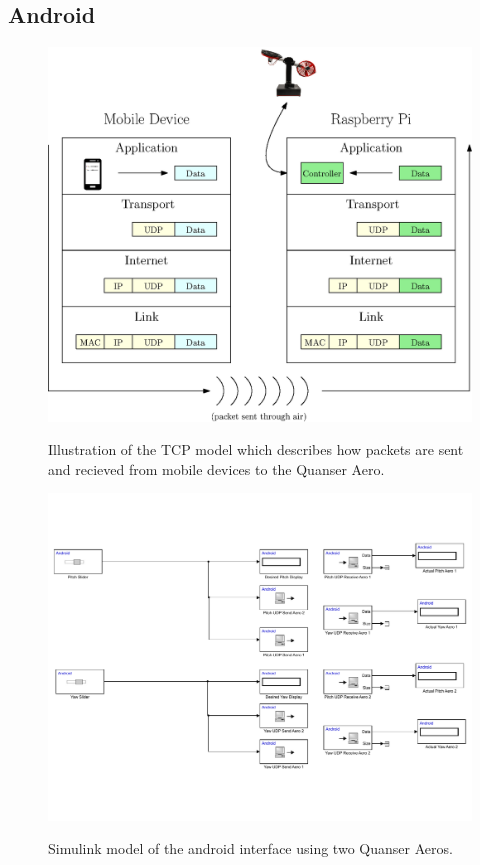 \subsection{Android}
\begin{figure}[!htbp]
    \centering
    \includegraphics[width=.46\textwidth,keepaspectratio=true]{figs/ipe/TCPModel.eps}
    \label{fig:TCPModel}
    \caption{Illustration of the TCP model which describes how packets are sent and recieved from mobile devices to the Quanser Aero.}
\end{figure}

\begin{figure}[!htbp]
    \centering
    \includegraphics[width=.46\textwidth,keepaspectratio=true]{figs/img/Android_Interface_2Aero}
    \label{fig:Android_Interface}
    \caption{Simulink model of the android interface using two Quanser Aeros.}
\end{figure}

